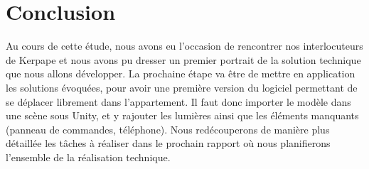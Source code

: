 \section{Conclusion}

Au cours de cette étude, nous avons eu l'occasion de rencontrer nos interlocuteurs de Kerpape et nous avons pu dresser un premier portrait de la solution technique que nous allons développer.
La prochaine étape va être de mettre en application les solutions évoquées, pour avoir une première version du logiciel permettant de se déplacer librement dans l'appartement. 
Il faut donc importer le modèle dans une scène sous Unity, et y rajouter les lumières ainsi que les éléments manquants (panneau de commandes, téléphone).
Nous redécouperons de manière plus détaillée les tâches à réaliser dans le prochain rapport où nous planifierons l'ensemble de la réalisation technique.